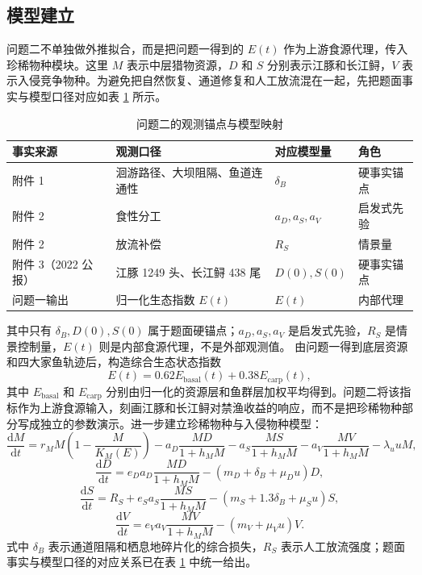 \documentclass{MMCStyle}
\begin{document}
\subsection{模型建立}
问题二不单独做外推拟合，而是把问题一得到的 $E(t)$ 作为上游食源代理，传入珍稀物种模块。这里 $M$ 表示中层猎物资源，$D$ 和 $S$ 分别表示江豚和长江鲟，$V$ 表示入侵竞争物种。为避免把自然恢复、通道修复和人工放流混在一起，先把题面事实与模型口径对应如表 \ref{tab:q2map} 所示。
\begin{table}[htbp]
\centering
\caption{问题二的观测锚点与模型映射}
\label{tab:q2map}
\begin{tabularx}{0.95\textwidth}{>{\raggedright\arraybackslash}p{2.4cm} >{\raggedright\arraybackslash}p{4.2cm} >{\raggedright\arraybackslash}p{3.6cm} X}
\toprule
事实来源 & 观测口径 & 对应模型量 & 角色 \\
\midrule
附件 1 & 洄游路径、大坝阻隔、鱼道连通性 & $\delta_B$ & 硬事实锚点 \\
附件 2 & 食性分工 & $a_D,a_S,a_V$ & 启发式先验 \\
附件 2 & 放流补偿 & $R_S$ & 情景量 \\
附件 3（2022 公报） & 江豚 1249 头、长江鲟 438 尾 & $D(0),S(0)$ & 硬事实锚点 \\
问题一输出 & 归一化生态指数 $E(t)$ & $E(t)$ & 内部代理 \\
\bottomrule
\end{tabularx}
\end{table}
其中只有 $\delta_B,D(0),S(0)$ 属于题面硬锚点；$a_D,a_S,a_V$ 是启发式先验，$R_S$ 是情景控制量，$E(t)$ 则是内部食源代理，不是外部观测值。
由问题一得到底层资源和四大家鱼轨迹后，构造综合生态状态指数
\begin{equation}
E(t)=0.62E_{\text{basal}}(t)+0.38E_{\text{carp}}(t),
\end{equation}
其中 $E_{\text{basal}}$ 和 $E_{\text{carp}}$ 分别由归一化的资源层和鱼群层加权平均得到。问题二将该指标作为上游食源输入，刻画江豚和长江鲟对禁渔收益的响应，而不是把珍稀物种部分写成独立的参数演示。进一步建立珍稀物种与入侵物种模型\cite{holling1959}：
\begin{equation}
\frac{\mathrm{d}M}{\mathrm{d}t}
=r_M M\left(1-\frac{M}{K_M(E)}\right)
-a_D\frac{MD}{1+h_MM}
-a_S\frac{MS}{1+h_MM}
-a_V\frac{MV}{1+h_MM}
-\lambda_u uM,
\end{equation}
\begin{equation}
\frac{\mathrm{d}D}{\mathrm{d}t}
=e_D a_D\frac{MD}{1+h_MM}-(m_D+\delta_B+\mu_Du)D,
\end{equation}
\begin{equation}
\frac{\mathrm{d}S}{\mathrm{d}t}
=R_S+e_S a_S\frac{MS}{1+h_MM}-(m_S+1.3\delta_B+\mu_Su)S,
\end{equation}
\begin{equation}
\frac{\mathrm{d}V}{\mathrm{d}t}
=e_V a_V\frac{MV}{1+h_MM}-(m_V+\mu_Vu)V.
\end{equation}
式中 $\delta_B$ 表示通道阻隔和栖息地碎片化的综合损失，$R_S$ 表示人工放流强度；题面事实与模型口径的对应关系已在表 \ref{tab:q2map} 中统一给出。
\end{document}

